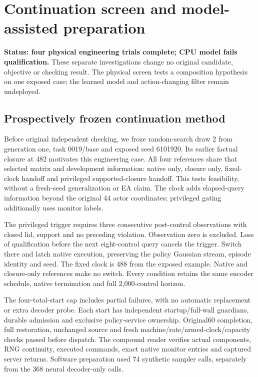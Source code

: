 \section{Continuation screen and model-assisted preparation}
\label{sec:model-followup}
\textbf{Status: four physical engineering trials complete; CPU model fails qualification.}
These separate investigations change no original candidate, objective or checking
result. The physical screen tests a composition hypothesis on one exposed case;
the learned model and action-changing filter remain undeployed.

\subsection{Prospectively frozen continuation method}
Before original independent checking, we froze random-search draw 2 from generation
one, task 0019/base and exposed seed 6101920. Its earlier factual closure at 482
motivates this engineering case. All four references share that selected matrix
and development information: native only, closure only, fixed-clock handoff and
privileged supported-closure handoff. This tests feasibility, without a fresh-seed
generalization or EA claim. The clock adds elapsed-query information beyond the
original 44 actor coordinates; privileged gating additionally uses monitor labels.

The privileged trigger requires three consecutive post-control observations with
closed lid, support and no preceding violation. Observation zero is excluded.
Loss of qualification before the next eight-control query cancels the trigger.
Switch there and latch native execution, preserving the policy Gaussian stream,
episode identity and seed. The fixed clock is 488 from the exposed example.
Native and closure-only references make no switch. Every condition retains the
same encoder schedule, native termination and full 2,000-control horizon.

The four-total-start cap includes partial failures, with no automatic replacement
or extra decoder probe. Each start has independent startup/full-wall guardians,
durable admission and exclusive policy-service ownership. Original60 completion,
full restoration, unchanged source and fresh machine/rate/armed-clock/capacity
checks passed before dispatch. The compound reader verifies actual components,
RNG continuity, executed commands, exact native monitor entries and captured
server returns. Software preparation used 74 synthetic sampler calls, separately
from the 368 neural decoder-only calls.

